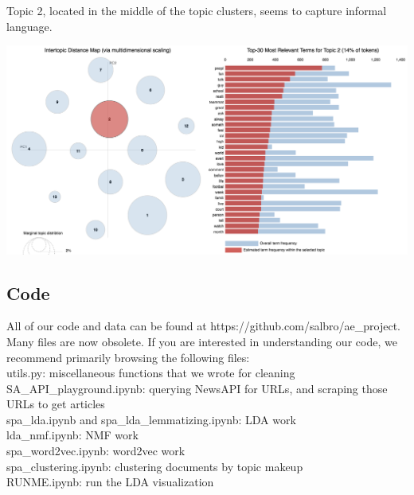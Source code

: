 \documentclass[11pt]{article}
\begin{document}
Topic 2, located in the middle of the topic clusters, seems to capture informal language. 

\includegraphics[width=470pt]{2.png} 

\subsection{Code}
All of our code and data can be found at https://github.com/salbro/ae\_project.  Many files are now obsolete. If you are interested in understanding our code, we recommend primarily browsing the following files: \\
utils.py: miscellaneous functions that we wrote for cleaning \\
SA\_API\_playground.ipynb: querying NewsAPI for URLs, and scraping those URLs to get articles \\
spa\_lda.ipynb and spa\_lda\_lemmatizing.ipynb: LDA work \\
lda\_nmf.ipynb: NMF work \\
spa\_word2vec.ipynb: word2vec work \\
spa\_clustering.ipynb: clustering documents by topic makeup \\
RUNME.ipynb: run the LDA visualization \\
\end{document}
